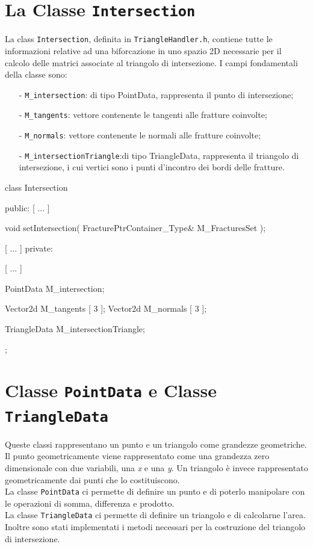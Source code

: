 \section{La Classe \texttt{Intersection}}

La class \texttt{Intersection}, definita in \texttt{TriangleHandler.h}, contiene tutte le informazioni relative ad una biforcazione in uno spazio 2D necessarie per il calcolo delle matrici associate al triangolo di intersezione.
I campi fondamentali della classe sono:
	\begin{enumerate}
	\item[-] \texttt{M\_intersection}: di tipo PointData, rappresenta il punto di intersezione;
	\item[-] \texttt{M\_tangents}: vettore contenente le tangenti alle fratture coinvolte;
	\item[-] \texttt{M\_normals}: vettore contenente le normali alle fratture coinvolte;
	\item[-] \texttt{M\_intersectionTriangle}:di tipo TriangleData, rappresenta il triangolo di intersezione, i cui vertici sono i punti d'incontro dei bordi delle fratture.
	\end{enumerate} 

\begin{Code03_03}[caption={Classe \texttt{Intersection}}]
class Intersection
{
 public:
	[ ... ]
	
	void setIntersection( FracturePtrContainer_Type& M_FracturesSet );
	
	[ ... ]
 private:
	
	[ ... ]	
	
	PointData M_intersection;
	
	Vector2d M_tangents [ 3 ];
	Vector2d M_normals [ 3 ];
	
	TriangleData M_intersectionTriangle;
};	
\end{Code03_03}

\section{Classe \texttt{PointData} e Classe \texttt{TriangleData}}
Queste classi rappresentano un punto e un triangolo come grandezze geometriche.
Il punto geometricamente viene rappresentato come una grandezza zero dimensionale con due variabili, una \textit{x} e una \textit{y}.
Un triangolo è invece  rappresentato geometricamente dai punti che lo costituiscono.\\
\noindent La classe \texttt{PointData} ci permette di definire un punto e di poterlo manipolare con le operazioni di somma, differenza e prodotto.\\
\noindent La classe \texttt{TriangleData} ci permette di definire un triangolo e di calcolarne l'area. Inoltre sono stati implementati i metodi necessari per la costruzione del triangolo di intersezione.
